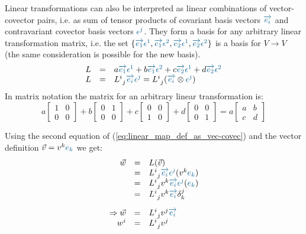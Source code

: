 Linear transformations can also be interpreted as linear combinations of vector-covector
pairs, i.e. as sum of tensor products of covariant basis vectors $\hdbv{i}$ and
contravariant covector basis vectors $\hdcbvc{j}$. They form a basis for any arbitrary
linear transformation matrix, i.e. the set
$\{\hdbv{1}\hdcbvc{1},\hdbv{1}\hdcbvc{2},\hdbv{2}\hdcbvc{1},\hdbv{2}\hdcbvc{2}\}$ is a
basis for $V \rightarrow V$ (the same consideration is possible for the new basis).
\begin{equation}
    \begin{array}{rcl}
        \label{eq:linear_map_def_as_vec-covec} 
        L & = & a\hdbv{1}\hdcbvc{1}+
                b\hdbv{1}\hdcbvc{2}+
                c\hdbv{2}\hdcbvc{1}+
                d\hdbv{2}\hdcbvc{2} \\
        L & = & L^{i~}_{~j} \hdbv{i}\hdcbvc{j} =
        L^{i~}_{~j} (\hdbv{i} \otimes\hdcbvc{j})
    \end{array}
\end{equation}
In matrix notation the matrix for an arbitrary linear transformation is:
\begin{equation}
    a\begin{bmatrix} 1 & 0 \\ 0 & 0 \end{bmatrix} + 
    b\begin{bmatrix} 0 & 1 \\ 0 & 0 \end{bmatrix} + 
    c\begin{bmatrix} 0 & 0 \\ 1 & 0 \end{bmatrix} + 
    d\begin{bmatrix} 0 & 0 \\ 0 & 1 \end{bmatrix} =
    a\begin{bmatrix} a & b \\ c & d \end{bmatrix}
\end{equation}

Using the second equation of (\ref{eq:linear_map_def_as_vec-covec}) and the vector
definition $\vec{v} = \hdvc{k} \hdbvc{k}$ we get:
\begin{equation}
    \begin{array}{rcl}
        \vec{w} & = & L(\vec{v}) \\
          & =  & L^{i~}_{~j} \hdbv{i}\hdcbvc{j} (\hdvc{k} \hdbvc{k}) \\
          & = & L^{i~}_{~j} \hdvc{k}\hdbv{i}\hdcbvc{j}(\hdbvc{k}) \\
          & = & L^{i~}_{~j} \hdvc{k}\hdbv{i} \delta^j_k \\
          \noalign{\vskip10pt}
        \Rightarrow \vec{w} & = & L^{i~}_{~j} \hdvc{j}\hdbv{i} \\
        w^i & = & L^{i~}_{~j} \hdvc{j}
    \end{array}
\end{equation}

\newpage
